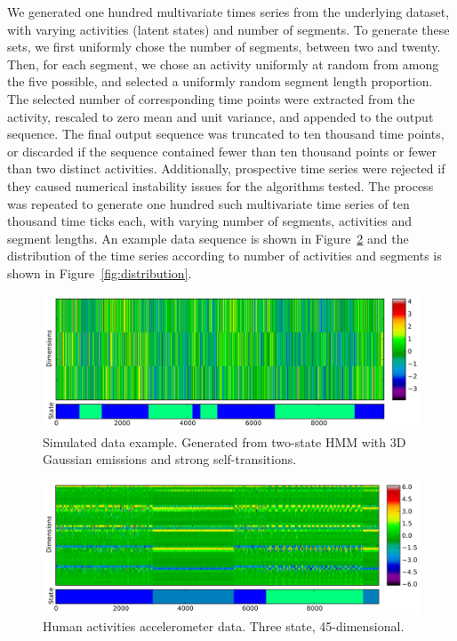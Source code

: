 \documentclass[letterpaper]{article}
\begin{document}
We generated one hundred multivariate times series from the underlying dataset,
with varying activities (latent states) and number of segments. To generate
these sets, we first uniformly chose the number of
segments, between two and twenty. Then, for each segment, we chose an activity
uniformly at random from among the five possible, and selected a uniformly
random segment length proportion. The selected number of corresponding time
points were extracted from the activity, rescaled to zero mean and unit
variance, and appended to the output sequence. The final output sequence was
truncated to ten thousand time points, or discarded if the sequence contained
fewer than ten thousand points or fewer than two distinct activities.
Additionally, prospective time series were rejected if they caused
numerical instability issues for the algorithms tested. The process was repeated to generate one hundred
such multivariate time series of ten thousand time ticks each, with varying number of segments,
activities and segment lengths. An example data sequence is shown in Figure~\ref{fig:accelerometer} and the
distribution of the time series according to number of activities and segments
is shown in Figure~\ref{fig:distribution}.
\begin{figure}[htbp]
\setlength{\abovecaptionskip}{0pt}
\setlength{\belowcaptionskip}{0cm}
\setlength{\floatsep}{0cm}
\centering
    \includegraphics[width=1.\linewidth]{images/3D_synthetic_data_example.pdf}    
  \caption{\small{Simulated data example. Generated from two-state HMM with 3D
  Gaussian emissions and strong self-transitions.}}
  \label{fig:simulated}
\end{figure}
\begin{figure}[htbp]  
\setlength{\abovecaptionskip}{0pt}
\setlength{\belowcaptionskip}{0cm}
\setlength{\floatsep}{0cm}
\centering
    \includegraphics[width=1.\linewidth]{images/accelerometer-data.pdf}
  \caption{\small{Human activities accelerometer data. Three state,
  45-dimensional.}}
    \label{fig:accelerometer}
\end{figure}
\end{document}
